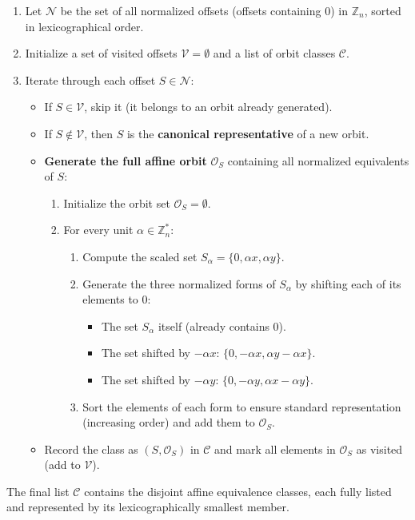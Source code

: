 \documentclass[12pt,letterpaper]{amsart}
\begin{document}
\begin{enumerate}
    \item Let $\mathcal{N}$ be the set of all normalized offsets (offsets containing 0) in $\mathbb{Z}_n$, sorted in lexicographical order.
    \item Initialize a set of visited offsets $\mathcal{V} = \emptyset$ and a list of orbit classes $\mathcal{C}$.
    \item Iterate through each offset $S \in \mathcal{N}$:
    \begin{itemize}
        \item If $S \in \mathcal{V}$, skip it (it belongs to an orbit already generated).
        \item If $S \notin \mathcal{V}$, then $S$ is the \textbf{canonical representative} of a new orbit.
        \item \textbf{Generate the full affine orbit} $\mathcal{O}_S$ containing all normalized equivalents of $S$:
        \begin{enumerate}
             \item Initialize the orbit set $\mathcal{O}_S = \emptyset$.
             \item For every unit $\alpha \in \mathbb{Z}_n^*$:
             \begin{enumerate}
                  \item Compute the scaled set $S_\alpha = \{0, \alpha x, \alpha y\}$.
                  \item Generate the three normalized forms of $S_\alpha$ by shifting each of its elements to 0:
                  \begin{itemize}
                      \item The set $S_\alpha$ itself (already contains 0).
                      \item The set shifted by $-\alpha x$: $\{0, -\alpha x, \alpha y - \alpha x\}$.
                      \item The set shifted by $-\alpha y$: $\{0, -\alpha y, \alpha x - \alpha y\}$.
                  \end{itemize}
                  \item Sort the elements of each form to ensure standard representation (increasing order) and add them to $\mathcal{O}_S$.
             \end{enumerate}
        \end{enumerate}
        \item Record the class as $(S, \mathcal{O}_S)$ in $\mathcal{C}$ and mark all elements in $\mathcal{O}_S$ as visited (add to $\mathcal{V}$).
    \end{itemize}
\end{enumerate}
The final list $\mathcal{C}$ contains the disjoint affine equivalence classes, each fully listed and represented by its lexicographically smallest member.
\end{document}

